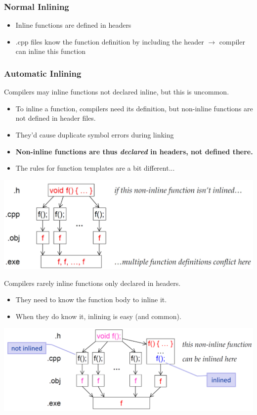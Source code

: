 \subsubsection{Normal Inlining}
\begin{itemize}
	\item Inline functions are defined in headers
	\item .cpp files know the function definition by including the header $\rightarrow$ compiler can inline this function
\end{itemize}

\subsubsection{Automatic Inlining}
\begin{multicols}{2}
Compilers may inline functions not declared inline, but this is uncommon.
\begin{itemize}
	\item To inline a function, compilers need its definition, but non-inline functions are not defined in header files.
	\item They'd cause duplicate symbol errors during linking
	\item \textbf{Non-inline functions are thus \textit{declared} in headers, not defined there.}
	\item The rules for function templates are a bit different...
\end{itemize}
\vfill\null
\columnbreak
\includegraphics[width=\linewidth]{images/AdvancedCPP/automaticInline}
\end{multicols}
\begin{multicols}{2}
Compilers rarely inline functions only declared in headers.
\begin{itemize}
	\item They need to know the function body to inline it.
	\item When they do know it, inlining is easy (and common).
\end{itemize}
\vfill\null
\columnbreak
\includegraphics[width=\linewidth]{images/AdvancedCPP/automaticInline2}
\end{multicols}


